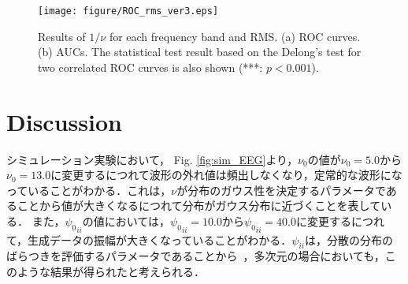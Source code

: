 \documentclass[journal]{IEEEtran}
\begin{document}
\begin{figure}[!t] %
\centering
\texttt{[image: figure/ROC\_rms\_ver3.eps]}
\caption{Results of $1/\nu$ for each frequency band and RMS. (a) ROC curves. (b) AUCs. The statistical test result based on the Delong's test for two correlated ROC curves is also shown (***: $p<0.001$).}
\label{fig:roc}
\end{figure}


\section{Discussion}
シミュレーション実験において，
Fig. \ref{fig:sim_EEG}より，$\nu_0$の値が$\nu_0 = 5.0$から$\nu_0 = 13.0$に変更するにつれて波形の外れ値は頻出しなくなり，定常的な波形になっていることがわかる．これは，$\nu$が分布のガウス性を決定するパラメータであることから値が大きくなるにつれて分布がガウス分布に近づくことを表している．
また，${\psi_0}_{ii}$の値においては，${\psi_0}_{ii}=10.0$から${\psi_0}_{ii}=40.0$に変更するにつれて，生成データの振幅が大きくなっていることがわかる．$\psi_{ii}$は，分散の分布のばらつきを評価するパラメータであることから~\cite{furui2019scale}，多次元の場合においても，このような結果が得られたと考えられる．
\end{document}
